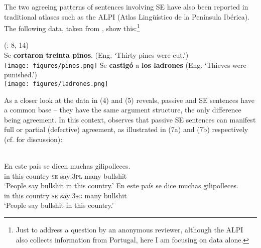 \documentclass[output=paper]{langsci/langscibook}
\begin{document}
The two agreeing patterns of sentences involving SE have also been reported in traditional atlases such as the ALPI (Atlas Lingüístico de la Península Ibérica). The following data, taken from \citet{Benito2010}, show this:\footnote{Just to address a question by an anonymous reviewer, although the ALPI also collects information from Portugal, here I am focusing on  data alone.}\largerpage[1.5] 

\ea%
    (\citealt{Benito2010}: 8, 14)
    \label{ex:gallego:6}\\
    \ea Se \textbf{cortaron treinta pinos}. (Eng. ‘Thirty pines were cut.’)\\
          \texttt{[image: figures/pinos.png]}
    \ex Se \textbf{castigó} a \textbf{los ladrones} (Eng. ‘Thieves were punished.’)\\
          \texttt{[image: figures/ladrones.png]}
    \z
\z

As a closer look at the data in (4) and (5) reveals, passive and  SE sentences have a common base – they have the same argument structure, the only difference being agreement. In this context, \citet[§26.3.2.2]{Mendikoetxea1999} observes that passive SE sentences can manifest full or partial (defective) agreement, as illustrated in (7a) and (7b) respectively (cf. \citealt{Martín1979} for discussion):

\ea%
    \label{ex:gallego:7}\\
    \ea
    \gll En  este  país        se   dicen       muchas  gilipolleces.       \\
         in   this   country  \textsc{se}  say\textsc{{}.3pl}  many     bullshit\\
    \glt ‘People say bullshit in this country.’
    \ex
    \gll En  este  país        se   dice        muchas  gilipolleces.       \\
         in   this   country  \textsc{se} say\textsc{{}.3sg}  many     bullshit \\
    \glt ‘People say bullshit in this country.’
    \z
\z\largerpage[-2]
\end{document}
